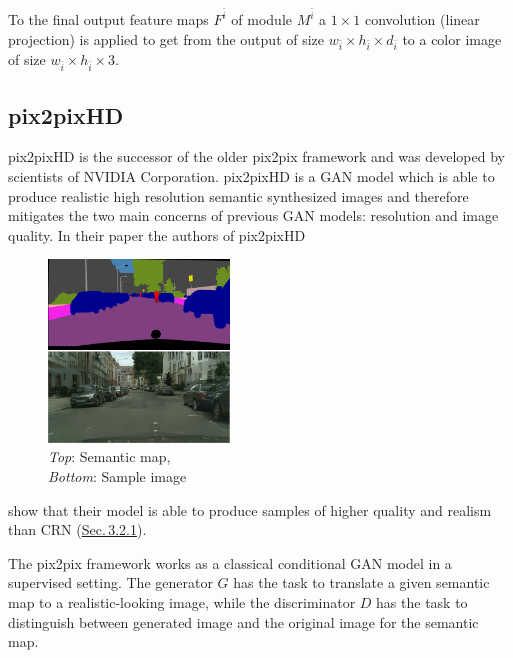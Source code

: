 To the final output feature maps $F^{\bar{i}}$ of module $M^{\bar{i}}$ a $1\times1$ convolution (linear projection) is applied to get from the output of size $w_{\bar{i}}\times h_{\bar{i}}\times d_{\bar{i}}$ to a color image of size $w_{\bar{i}}\times h_{\bar{i}}\times3$.

\subsection{pix2pixHD} \label{sec:3.2.2}
pix2pixHD \cite{pix2pixHD} is the successor of the older pix2pix \cite{pix2pix} framework and was developed by scientists of NVIDIA Corporation. pix2pixHD is a GAN model which is able to produce realistic high resolution semantic synthesized images and therefore mitigates the two main concerns of previous GAN models: resolution and image quality. In their paper the authors of pix2pixHD 
%
\begin{figure}
    \begin{center}
        \includegraphics[width=0.43\textwidth]{Chapters/figures/pix2pixHD_example.PNG}
    \end{center}
    \caption[]{\textit{Top}: Semantic map, \\\textit{Bottom}: Sample image}
\end{figure}
%
show that their model is able to produce samples of higher quality and realism than CRN (\hyperref[sec:3.2.1]{Sec.\,3.2.1}).

The pix2pix framework works as a classical conditional GAN model in a supervised setting. The generator $G$ has the task to translate a given semantic map to a realistic-looking image, while the discriminator $D$ has the task to distinguish between generated image and the original image for the semantic map.

